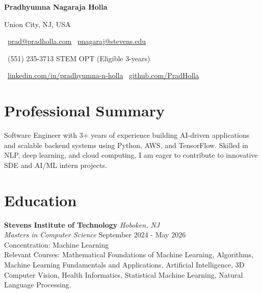\documentclass[11pt,a4paper]{article}
\newcommand{\headerfont}{\sffamily\bfseries}  %
\newcommand{\headername}[1]{{\fontsize{16}{19}\headerfont #1}}  %
\begin{document}

\begin{center}
    \headername{Pradhyumna Nagaraja Holla}  %
    
    \vspace{0.3em}
    {\large Union City, NJ, USA}
    
    \vspace{0.3em}
    {\faEnvelope\ \href{mailto:prad@pradholla.com}{prad@pradholla.com} 
    \quad\textbullet\quad 
    \faEnvelope\ \href{mailto:pnagaraj@stevens.edu}{pnagaraj@stevens.edu}}
    
    \vspace{0.2em}
    {\faPhone\ (551) 235-3713 
    \quad\textbullet\quad 
    STEM OPT (Eligible 3-years)}
    
    \vspace{0.2em}
    {\faLinkedin\ \href{https://www.linkedin.com/in/pradhyumna-n-holla/}{linkedin.com/in/pradhyumna-n-holla} 
    \quad\textbullet\quad 
    \faGithub\ \href{https://github.com/PradHolla}{github.com/PradHolla}}
\end{center}
\section*{Professional Summary}
\begin{spacing}{1.1}
    Software Engineer with 3+ years of experience building AI-driven applications and scalable backend systems using Python, AWS, and TensorFlow. Skilled in NLP, deep learning, and cloud computing, I am eager to contribute to innovative SDE and AI/ML intern projects.\end{spacing}
\vspace{-0.5em}  %

\section*{Education}
\noindent\textbf{Stevens Institute of Technology} \hfill \textit{Hoboken, NJ}\\
\textit{Masters in Computer Science} \hfill September 2024 - May 2026\\
Concentration: Machine Learning\\
{Relevant Courses:} Mathematical Foundations of Machine Learning, Algorithms, Machine Learning Fundamentals and Applications, Artificial Intelligence, 3D Computer Vision, Health Informatics, Statistical Machine Learning, Natural Language Processing.
\vspace{-0.5em}
\end{document}
